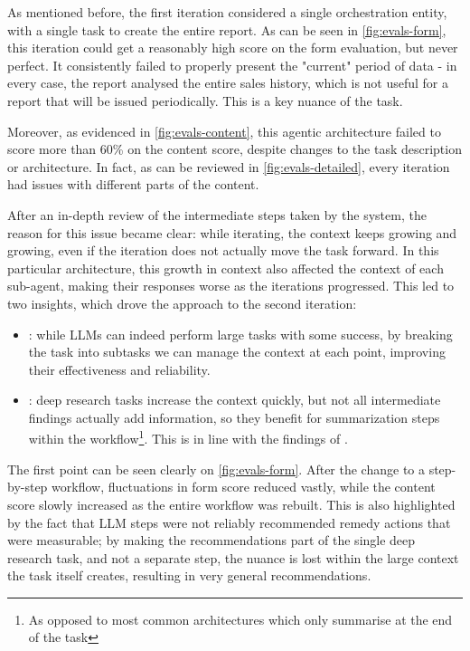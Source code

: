 \documentclass[a4paper]{report}
\begin{document}
As mentioned before, the first iteration considered a single orchestration entity, with a single task to create the entire report. As can be seen in \autoref{fig:evals-form}, this iteration could get a reasonably high score on the form evaluation, but never perfect. It consistently failed to properly present the "current" period of data - in every case, the report analysed the entire sales history, which is not useful for a report that will be issued periodically. This is a key nuance of the task.

Moreover, as evidenced in \autoref{fig:evals-content}, this agentic architecture failed to score more than 60\% on the content score, despite changes to the task description or architecture. In fact, as can be reviewed in \autoref{fig:evals-detailed}, every iteration had issues with different parts of the content.

After an in-depth review of the intermediate steps taken by the system, the reason for this issue became clear: while iterating, the context keeps growing and growing, even if the iteration does not actually move the task forward. In this particular architecture, this growth in context also affected the context of each sub-agent, making their responses worse as the iterations progressed. This led to two insights, which drove the approach to the second iteration:

\begin{itemize}
    \item {}\kfid : while LLMs can indeed perform large tasks with some success, by breaking the task into subtasks we can manage the context at each point, improving their effectiveness and reliability.
    \item {}\kfid : deep research tasks increase the context quickly, but not all intermediate findings actually add information, so they benefit for summarization steps within the workflow\footnote{As opposed to most common architectures which only summarise at the end of the task}. This is in line with the findings of \cite{veseli2025positionalbiasesshiftinputs}.
\end{itemize}

The first point can be seen clearly on \autoref{fig:evals-form}. After the change to a step-by-step workflow, fluctuations in form score reduced vastly, while the content score slowly increased as the entire workflow was rebuilt. This is also highlighted by the fact that LLM steps were not reliably recommended remedy actions that were measurable; by making the recommendations part of the single deep research task, and not a separate step, the nuance is lost within the large context the task itself creates, resulting in very general recommendations.
\end{document}
